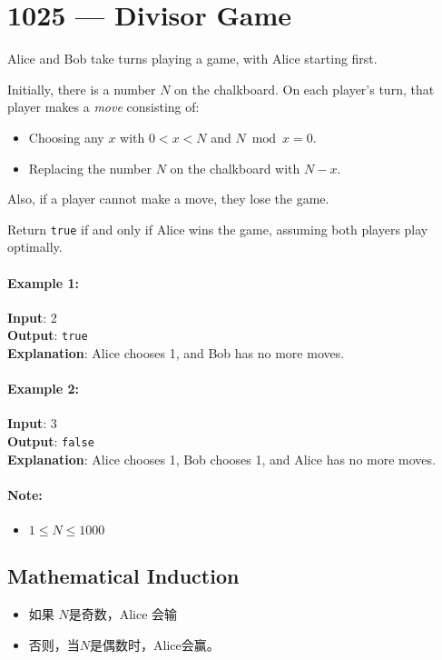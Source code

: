 \section{1025 --- Divisor Game}
Alice and Bob take turns playing a game, with Alice starting first.
\par
Initially, there is a number $ N $ on the chalkboard.  On each player's turn, that player makes a \textit{move} consisting of:
\begin{itemize}
\item Choosing any $ x $ with $ 0 < x < N $ and $ N \bmod x = 0 $.
\item Replacing the number $ N $ on the chalkboard with $ N - x $.
\end{itemize}
\par
Also, if a player cannot make a move, they lose the game.
\par
Return \texttt{true} if and only if Alice wins the game, assuming both players play optimally.

 
\paragraph{Example 1:}

\begin{flushleft}
\textbf{Input}: 2
\\
\textbf{Output}: \texttt{true}
\\
\textbf{Explanation}: Alice chooses 1, and Bob has no more moves.
\end{flushleft}

\paragraph{Example 2:}

\begin{flushleft}
\textbf{Input}: 3
\\
\textbf{Output}: \texttt{false}
\\
\textbf{Explanation}: Alice chooses 1, Bob chooses 1, and Alice has no more moves.
\end{flushleft}
 

\paragraph{Note:}
\begin{itemize}
\item $ 1 \leq N \leq 1000 $
\end{itemize}

\subsection{Mathematical Induction}
\begin{itemize}
\item 如果 $N$是奇数，Alice 会输
\item 否则，当$N$是偶数时，Alice会赢。
\end{itemize}